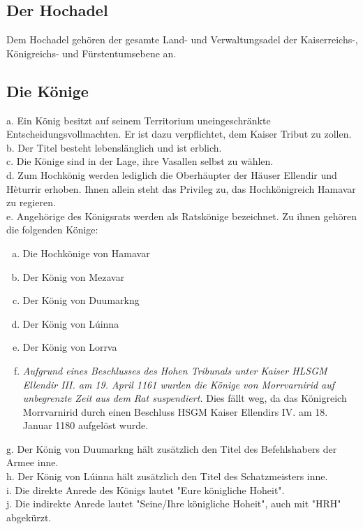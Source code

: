 \documentclass{article}
\begin{document}
\subsection{Der Hochadel}
Dem Hochadel gehören der gesamte Land- und Verwaltungsadel der Kaiserreichs-, Königreichs- und Fürstentumsebene an.

\subsection{Die Könige}\label{koenige} 
a. Ein König besitzt auf seinem Territorium uneingeschränkte Entscheidungsvollmachten. Er ist dazu verpflichtet, dem Kaiser Tribut zu zollen.  \\
b. Der Titel besteht lebenslänglich und ist erblich.  \\
c. Die Könige sind in der Lage, ihre Vasallen selbst zu wählen.  \\
d. Zum Hochkönig werden lediglich die Oberhäupter der Häuser Ellendir und Hèturrir erhoben. Ihnen allein steht das Privileg zu, das Hochkönigreich Hamavar zu regieren.\\
e. Angehörige des Königsrats werden als Ratskönige bezeichnet. Zu ihnen gehören die folgenden Könige:  \\
\begin{enumerate}[a)]
\item Die Hochkönige von Hamavar  
\item Der König von Mezavar  
\item Der König von Duumarkng  
\item Der König von Lúinna  
\item Der König von Lorrva  
\item \textit{Aufgrund eines Beschlusses des Hohen Tribunals unter Kaiser HLSGM Ellendir III. am 19. April 1161 wurden die Könige von Morrvarnirid auf unbegrenzte Zeit aus dem Rat suspendiert.} Dies fällt weg, da das Königreich Morrvarnirid durch einen Beschluss HSGM Kaiser Ellendirs IV. am 18. Januar 1180 aufgelöst wurde.
\end{enumerate}
g. Der König von Duumarkng hält zusätzlich den Titel des Befehlshabers der Armee inne.  \\
h. Der König von Lúinna hält zusätzlich den Titel des Schatzmeisters inne.  \\
i. Die direkte Anrede des Königs lautet "Eure königliche Hoheit".  \\
j. Die indirekte Anrede lautet "Seine/Ihre königliche Hoheit", auch mit "HRH" abgekürzt.
\end{document}
